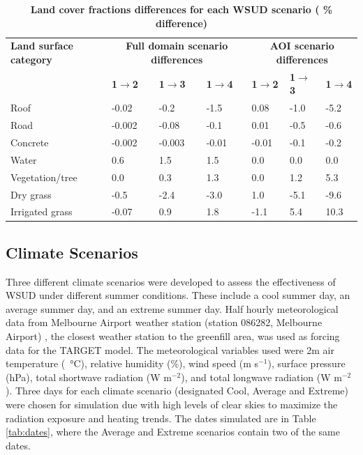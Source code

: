 \documentclass[final,3p,times,authoryear]{elsarticle}
\begin{document}
\begin{table}[!htbp]
\caption{\bf Land cover fractions differences for each WSUD scenario ( \% difference)  \label{tab:parametersDiff}}     
\begin{tabular}{ l l l l l l l }

  \hline  \textbf{Land surface category } &  \multicolumn{3}{|c|}{\textbf{Full domain scenario differences}} & \multicolumn{3}{c|}{\textbf{AOI scenario differences}}  \\ 

\textbf{} & \textbf{1$\rightarrow$2} & \textbf{ 1$\rightarrow$3}  & \textbf{1$\rightarrow$4}& \textbf{1$\rightarrow$2} & \textbf{ 1$\rightarrow$3}  & \textbf{1$\rightarrow$4}  \\ \hline
Roof	&-0.02&	-0.2&	-1.5	&0.08&	-1.0&	-5.2\\		
Road	&-0.002&	-0.08&	-0.1&0.01&	-0.5&	-0.6\\		
Concrete	&-0.002&	-0.003&	-0.01&-0.01&	-0.1&	-0.2	\\	
Water	&0.6&	1.5&	1.5	&0.0&	0.0&	0.0	\\
Vegetation/tree 	&0.0&	0.3&	1.3		&0.0&	1.2&	5.3	\\
Dry grass &-0.5&	-2.4&	-3.0		&1.0&	-5.1&	-9.6\\
Irrigated grass	&-0.07&	0.9&	1.8	&-1.1&	5.4&	10.3\\	
\hline
\end{tabular}
\end{table}








\subsection{Climate Scenarios}\label{sec:methods_climate_scenarios}

Three different climate scenarios were developed to assess the effectiveness of WSUD under different summer conditions. These include a cool summer day, an average summer day, and an extreme summer day. Half hourly meteorological data from Melbourne Airport weather station (station 086282, Melbourne Airport) \citep{BOM2016b}, the closest weather station to the greenfill area, was used as forcing data for the TARGET model. The meteorological variables used were 2m air temperature (\SI{}{\degreeCelsius}), relative humidity (\%), wind speed (m s$^{-1}$), surface pressure (hPa), total shortwave radiation (W m$^{-2}$), and total longwave radiation (W m$^{-2}$). Three days for each climate scenario (designated Cool, Average and Extreme) were chosen for simulation due with high levels of clear skies to maximize the radiation exposure and heating trends. The dates simulated are in Table \ref{tab:dates}, where the Average and Extreme scenarios contain two of the same dates.
\end{document}
